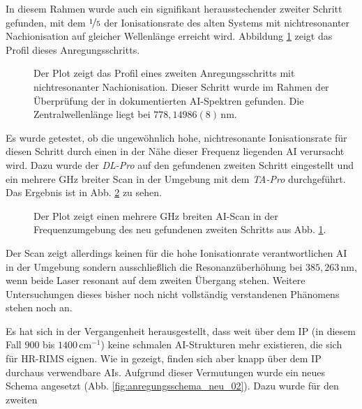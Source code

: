 In diesem Rahmen wurde auch ein signifikant herausstechender zweiter Schritt
gefunden, mit dem $\nicefrac{1}{5}$ der Ionisationsrate des alten Systems mit
nichtresonanter Nachionisation auf gleicher Wellenlänge erreicht wird. Abbildung
\ref{fig:linienscans_neues_schema_01_fake_AI_krass_mean} zeigt das Profil dieses
Anregungsschritts.
\begin{figure}[h]
 	\centering
 	\footnotesize
	
	\caption[zweiter Schritt aus AI-Spektren]{Der Plot zeigt das Profil
	eines zweiten Anregungsschritts mit nichtresonanter Nachionisation. Dieser
	Schritt wurde im Rahmen der Überprüfung der in \cite{raeder:2011:dissertation} dokumentierten
	AI-Spektren gefunden. Die Zentralwellenlänge liegt bei $778,14986(8)\,$nm.}
	\label{fig:linienscans_neues_schema_01_fake_AI_krass_mean}
\end{figure}
Es wurde getestet, ob die ungewöhnlich hohe, nichtresonante Ionisationsrate für
diesen Schritt durch einen in der Nähe dieser Frequenz liegenden AI verursacht
wird. Dazu wurde der \textit{DL-Pro} auf den gefundenen zweiten Schritt
eingestellt und ein mehrere GHz breiter Scan in der Umgebung mit dem \textit{TA-Pro} durchgeführt.
Das Ergebnis ist in Abb.
\ref{fig:linienscans_neues_schema_01_fake_AI_krass_umgebung_mean} zu sehen.
\begin{figure}[h]
 	\centering
 	\footnotesize
	
	\caption[zweiter Schritt aus AI-Spektren, Umgebungsscan]{Der Plot zeigt
	einen mehrere GHz breiten AI-Scan in der Frequenzumgebung des neu
	gefundenen zweiten Schritts aus Abb.
	\ref{fig:linienscans_neues_schema_01_fake_AI_krass_mean}.}
	\label{fig:linienscans_neues_schema_01_fake_AI_krass_umgebung_mean}
\end{figure}
Der Scan zeigt allerdings keinen für die hohe Ionisationrate verantwortlichen AI
in der Umgebung sondern ausschließlich die Resonanzüberhöhung bei
$385,263\,$nm, wenn beide Laser resonant auf dem zweiten Übergang stehen.
Weitere Untersuchungen dieses bisher noch nicht vollständig verstandenen
Phänomens stehen noch an.\par
Es hat sich in der Vergangenheit herausgestellt, dass weit
über dem IP (in diesem Fall $900$ bis $1400\,$cm$^{-1}$) keine
schmalen AI-Strukturen mehr existieren, die sich für HR-RIMS eignen. Wie in
\cite{Bushaw2007485} gezeigt, finden sich aber knapp über dem IP durchaus verwendbare AIs.
Aufgrund dieser Vermutungen wurde ein neues Schema angesetzt
(Abb. \ref{fig:anregungsschema_neu_02}). Dazu wurde für den zweiten

